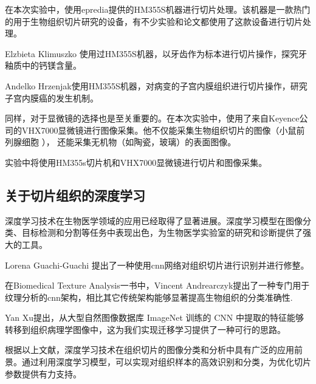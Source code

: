 在本次实验中，使用epredia提供的HM355S机器进行切片处理。该机器是一款热门的用于生物组织切片研究的设备，有不少实验和论文都使用了这款设备进行切片处理。

Elzbieta Klimuszko 使用过HM355S机器，以牙齿作为标本进行切片操作，探究牙釉质中的钙镁含量。\cite{LR.2}


Andelko Hrzenjak使用HM355S机器，对病变的子宫内膜组织进行切片操作，研究子宫内膜癌的发生机制。\cite{LR.3}

同样，对于显微镜的选择也是至关重要的。在本次实验中，使用了来自Keyence公司的VHX7000显微镜进行图像采集。他不仅能采集生物组织切片的图像（小鼠前列腺细胞
\cite{LR.4}
），
还能采集无机物（如陶瓷\cite{LR.5}，玻璃\cite{LR.6}）的表面图像。


实验中将使用HM355s切片机和VHX7000显微镜进行切片和图像采集。


\subsection{关于切片组织的深度学习}

深度学习技术在生物医学领域的应用已经取得了显著进展。深度学习模型在图像分类、目标检测和分割等任务中表现出色，为生物医学实验室的研究和诊断提供了强大的工具。

Lorena Guachi-Guachi 提出了一种使用cnn网络对组织切片进行识别并进行修整。\cite{LR.7}



在Biomedical Texture Analysis一书中，Vincent Andrearczyk提出了一种专门用于纹理分析的cnn架构，相比其它传统架构能够显著提高生物组织的分类准确性.\cite{LR.8}



Yan Xu提出，从大型自然图像数据库 ImageNet 训练的 CNN 中提取的特征能够转移到组织病理学图像中，这为我们实现迁移学习提供了一种可行的思路。\cite{LR.9}


根据以上文献，深度学习技术在组织切片的图像分类和分析中具有广泛的应用前景。通过利用深度学习模型，可以实现对组织样本的高效识别和分类，为优化切片参数提供有力支持。

\FloatBarrier %
